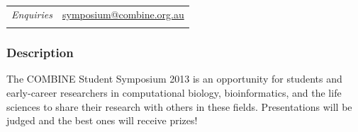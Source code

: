 \documentclass[10pt,]{article}
\begin{document}
\begin{longtable}[c]{@{}ll@{}}


\begin{minipage}[t]{0.30\columnwidth}\raggedright
\emph{Enquiries}
\end{minipage} & \begin{minipage}[t]{0.70\columnwidth}\raggedright
\href{mailto:symposium@combine.org.au}{symposium@combine.org.au}
\end{minipage}
\\\noalign{\medskip}
\hline
\end{longtable}



\subsubsection{Description}

The COMBINE Student Symposium 2013 is an opportunity for students and
early-career researchers in computational biology, bioinformatics, and the life
sciences to share their research with others in these fields. Presentations
will be judged and the best ones will receive prizes!
\end{document}
